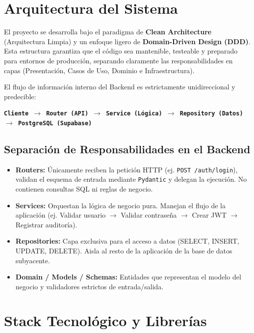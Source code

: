 \documentclass[12pt,a4paper]{article}
\begin{document}
\section{Arquitectura del Sistema}
El proyecto se desarrolla bajo el paradigma de \textbf{Clean Architecture} (Arquitectura Limpia) y un enfoque ligero de \textbf{Domain-Driven Design (DDD)}. Esta estructura garantiza que el código sea mantenible, testeable y preparado para entornos de producción, separando claramente las responsabilidades en capas (Presentación, Casos de Uso, Dominio e Infraestructura).

El flujo de información interno del Backend es estrictamente unidireccional y predecible:
\begin{center}
    \texttt{\textbf{Cliente $\rightarrow$ Router (API) $\rightarrow$ Service (Lógica) $\rightarrow$ Repository (Datos) $\rightarrow$ PostgreSQL (Supabase)}}
\end{center}

\subsection{Separación de Responsabilidades en el Backend}
\begin{itemize}
    \item \textbf{Routers:} Únicamente reciben la petición HTTP (ej. \texttt{POST /auth/login}), validan el esquema de entrada mediante \texttt{Pydantic} y delegan la ejecución. No contienen consultas SQL ni reglas de negocio.
    \item \textbf{Services:} Orquestan la lógica de negocio pura. Manejan el flujo de la aplicación (ej. Validar usuario $\rightarrow$ Validar contraseña $\rightarrow$ Crear JWT $\rightarrow$ Registrar auditoría).
    \item \textbf{Repositories:} Capa exclusiva para el acceso a datos (SELECT, INSERT, UPDATE, DELETE). Aisla al resto de la aplicación de la base de datos subyacente.
    \item \textbf{Domain / Models / Schemas:} Entidades que representan el modelo del negocio y validadores estrictos de entrada/salida.
\end{itemize}

\section{Stack Tecnológico y Librerías}
\end{document}
